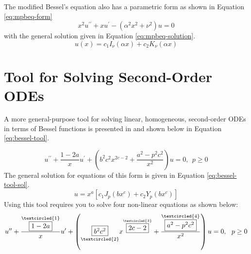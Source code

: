 The modified Bessel's equation also has a parametric form as shown in Equation \ref{eq:mpbeq-form}
\begin{equation}
x^2u^{\prime \prime} + xu^{\prime} - \left(\alpha^2 x^2 + \nu^2 \right)u = 0
\label{eq:mpbeq-form}
\end{equation}
with the general solution given in Equation \ref{eq:mpbeq-solution}.
\begin{equation}
u(x) = c_1I_{\nu}(\alpha x) + c_2 K_{\nu}(\alpha x)
\label{eq:mpbeq-solution}
\end{equation}

\section{Tool for Solving Second-Order ODEs}
A more general-purpose tool for solving linear, homogeneous, second-order ODEs in terms of Bessel functions is presented in \cite{zill2020advanced} and shown below in Equation \ref{eq:bessel-tool}.

\begin{equation}
u^{\prime \prime} + \frac{1-2a}{x}u^{\prime} + \left(b^2 c^2 x^{2c-2} + \frac{a^2-p^2c^2}{x^2} \right)u = 0, \ \ p \ge 0
\label{eq:bessel-tool}
\end{equation}
The general solution for equations of this form is given in Equation \ref{eq:bessel-tool-sol}.
\begin{equation}
u = x^a\left[c_1 J_{p}\left(bx^c \right)+c_2Y_{p}\left(bx^c \right) \right]
\label{eq:bessel-tool-sol}
\end{equation}
Using this tool requires you to solve four non-linear equations as shown below:
\begin{equation*}
u^{\prime \prime} + \frac{\overset{\textcircled{1}}{\fbox{$1-2a$}}}{x}u^{\prime} + \left(\underset{\textcircled{2}}{\fbox{$b^2 c^2$}} x^{\overset{\textcircled{3}}{\fbox{$2c-2$}}} + \frac{\overset{\textcircled{4}}{\fbox{$a^2-p^2c^2$}}}{x^2} \right)u = 0, \ \ p \ge 0
\end{equation*}

\vspace{0.5cm}

